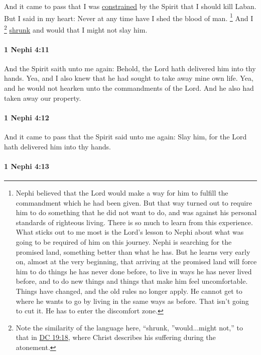 			And it came to pass that
			I was \hyperref[CONSTRAIN]{constrained} by the Spirit that I should kill Laban.
			But I said in my heart:
			Never at any time have I shed the blood of man.%
				\footnote{%
					Nephi believed that the Lord would make a way for him to fulfill the commandment which he had been given. But that way turned out to require him to do something that he did not want to do, and was against his personal standards of righteous living. There is so much to learn from this experience. What sticks out to me most is the Lord's lesson to Nephi about what was going to be required of him on this journey. Nephi is searching for the promised land, something better than what he has. But he learns very early on, almost at the very beginning, that arriving at the promised land will force him to do things he has never done before, to live in ways he has never lived before, and to do new things and things that make him feel uncomfortable. Things have changed, and the old rules no longer apply. He cannot get to where he wants to go by living in the same ways as before. That isn't going to cut it. He has to enter the discomfort zone.
					}
			And I
				\footnote{%
					Note the similarity of the language here, ``shrunk, ''would...might not,'' to that in \hyperref[DC19-18]{DC 19:18}, where Christ describes his suffering during the atonement.
					}%
			\hyperref[SHRINK]{shrunk} and would that I might not slay him.

		\paragraph{1 Nephi 4:11} %
			\label{1NEPHI-4-11}

			And the Spirit saith unto me again:
			Behold, the Lord hath delivered him into thy hands.
			Yea, and I also knew that he had sought to take away mine own life.
			Yea, and he would not hearken unto the commandments of the Lord.
			And he also had taken away our property.

		\paragraph{1 Nephi 4:12} %
			\label{1NEPHI-4-12}

			And it came to pass that the Spirit said unto me again:
			Slay him, for the Lord hath delivered him into thy hands.

		\paragraph{1 Nephi 4:13} %
			\label{1NEPHI-4-13}

